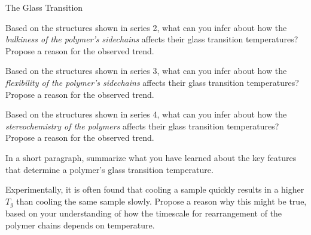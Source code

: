 \begin{activity}{The Glass Transition}
\begin{ctqs}
		\begin{solution}[1.5in]
		\end{solution}
	

	\question Based on the structures shown in series 2, what can you infer about how the \emph{bulkiness of the polymer's sidechains} affects their glass transition temperatures?  Propose a reason for the observed trend.
	
		\begin{solution}[1.5in]
		\end{solution}
	
	\question Based on the structures shown in series 3, what can you infer about how the \emph{flexibility of the polymer's sidechains} affects their glass transition temperatures?  Propose a reason for the observed trend.
	
		\begin{solution}[1.5in]
		\end{solution}
		
	\question Based on the structures shown in series 4, what can you infer about how the \emph{stereochemistry of the polymers} affects their glass transition temperatures?  Propose a reason for the observed trend.
	
		\begin{solution}[1.5in]
		\end{solution}
	
	\question In a short paragraph, summarize what you have learned about the key features that determine a polymer's glass transition temperature.
	
		\begin{solution}[2in]
		\end{solution}
	
\end{ctqs}

\begin{exercises}

	\exercise Experimentally, it is often found that cooling a sample quickly results in a higher $T_g$ than cooling the same sample slowly.  Propose a reason why this might be true, based on your understanding of how the timescale for rearrangement of the polymer chains depends on temperature.
	
		
	
\end{exercises}


%
%	


	
\end{activity}